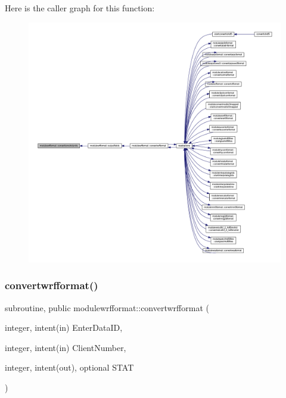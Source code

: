 Here is the caller graph for this function\+:\nopagebreak
\begin{figure}[H]
\begin{center}
\leavevmode
\includegraphics[width=350pt]{namespacemodulewrfformat_a9a0d0071658920421e26356debdbac89_icgraph}
\end{center}
\end{figure}
\mbox{\label{namespacemodulewrfformat_aa35fbb60f9455409be248675ba032799}} 
\subsubsection{\texorpdfstring{convertwrfformat()}{convertwrfformat()}}
{\footnotesize\ttfamily subroutine, public modulewrfformat\+::convertwrfformat (\begin{DoxyParamCaption}\item[{integer, intent(in)}]{Enter\+Data\+ID,  }\item[{integer, intent(in)}]{Client\+Number,  }\item[{integer, intent(out), optional}]{S\+T\+AT }\end{DoxyParamCaption})}

